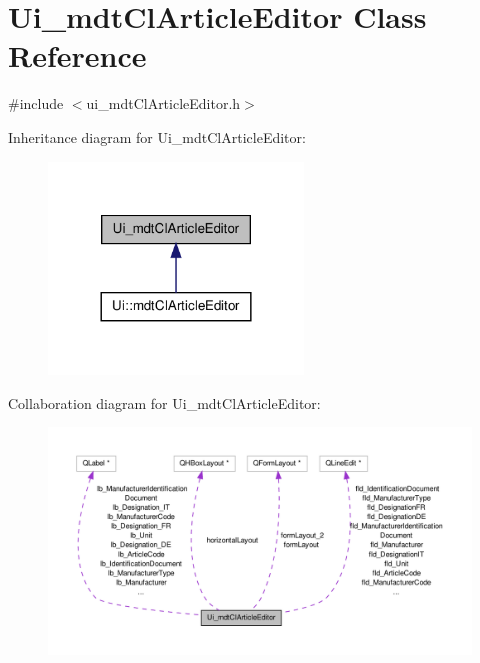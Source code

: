 \hypertarget{class_ui__mdt_cl_article_editor}{\section{Ui\-\_\-mdt\-Cl\-Article\-Editor Class Reference}
\label{class_ui__mdt_cl_article_editor}
}


{\ttfamily \#include $<$ui\-\_\-mdt\-Cl\-Article\-Editor.\-h$>$}



Inheritance diagram for Ui\-\_\-mdt\-Cl\-Article\-Editor\-:\nopagebreak
\begin{figure}[H]
\begin{center}
\leavevmode
\includegraphics[width=192pt]{class_ui__mdt_cl_article_editor__inherit__graph}
\end{center}
\end{figure}


Collaboration diagram for Ui\-\_\-mdt\-Cl\-Article\-Editor\-:\nopagebreak
\begin{figure}[H]
\begin{center}
\leavevmode
\includegraphics[width=350pt]{class_ui__mdt_cl_article_editor__coll__graph}
\end{center}
\end{figure}
